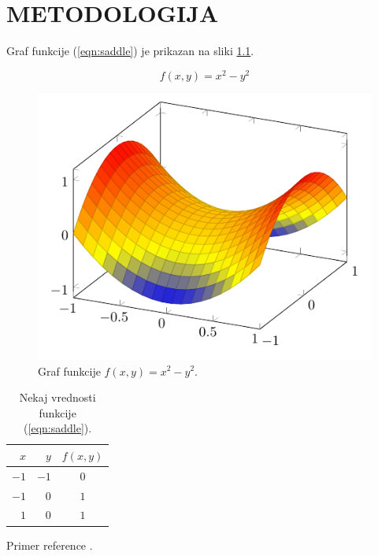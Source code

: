 \chapter{METODOLOGIJA}

\noindent
Graf funkcije (\ref{eqn:saddle}) je prikazan na sliki \ref{fig:plot}.

\begin{equation}
    f(x, y) = x^2 - y^2
    \label{eqn:saddle}
\end{equation}

\begin{figure}[ht]
    \centering
    \includegraphics[width=0.6\linewidth]{images/plot.pdf}
    \caption{Graf funkcije $f(x, y) = x^2 - y^2$.}
    \label{fig:plot}
\end{figure}

\begin{table}[ht]
    \centering
    \caption{Nekaj vrednosti funkcije (\ref{eqn:saddle}).}
    \begin{tabular}{|rr|c|}
        \hline
        $x$  & $y$  & $f(x, y)$ \\
        \hline
        $-1$ & $-1$ & $0$ \\
        $-1$ & $0$  & $1$ \\
        $1$ & $0$   & $1$ \\
        \hline
    \end{tabular}
\end{table}

\noindent
Primer reference \cite{RussellNorvig:2021}.